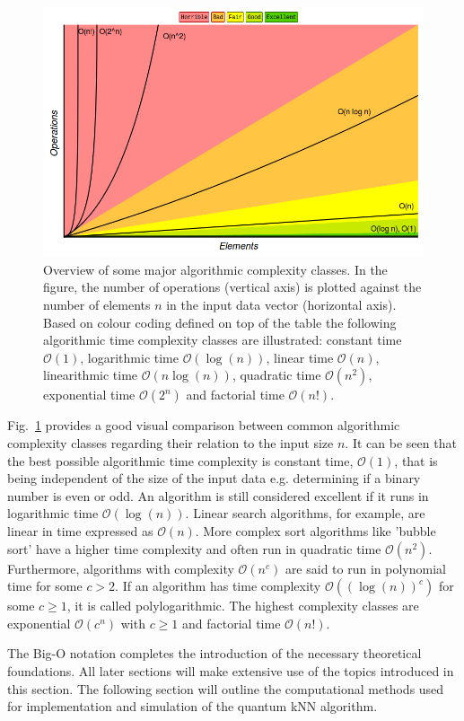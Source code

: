 \begin{figure}[H]
      \centering
       \includegraphics[scale=0.43]{img/bigocomplexity.png}
       \caption[]{\label{fig:algcomplexities} Overview of some major algorithmic complexity classes. In the figure, the number of operations (vertical axis) is plotted against the number of elements $n$ in the input data vector (horizontal axis). Based on colour coding defined on top of the table the following algorithmic time complexity classes are illustrated: constant time $\mathcal{O}(1)$, logarithmic time $\mathcal{O}(\log(n))$, linear time $\mathcal{O}(n)$, linearithmic time $\mathcal{O}(n\mathrm{ }\log(n))$, quadratic time $\mathcal{O}(n^2)$, exponential time $\mathcal{O}(2^n)$ and factorial time $\mathcal{O}(n!)$.\footnotemark[6]}
\end{figure}

Fig.~\ref{fig:algcomplexities} provides a good visual comparison between common algorithmic complexity classes regarding their relation to the input size $n$. It can be seen that the best possible algorithmic time complexity is constant time, $\mathcal{O}(1)$, that is being independent of the size of the input data e.g. determining if a binary number is even or odd. An algorithm is still considered excellent if it runs in logarithmic time $\mathcal{O}(\log(n))$. Linear search algorithms, for example, are linear in time expressed as $\mathcal{O}(n)$. More complex sort algorithms like 'bubble sort' have a higher time complexity and often run in quadratic time $\mathcal{O}(n^2)$. Furthermore, algorithms with complexity $\mathcal{O}(n^c)$ are said to run in polynomial time for some $c > 2$. If an algorithm has time complexity $\mathcal{O}((\log(n))^c)$ for some $c \geq 1$, it is called polylogarithmic. The highest complexity classes are exponential $\mathcal{O}(c^n)$ with $c \geq 1$ and factorial time $\mathcal{O}(n!)$. 

The Big-O notation completes the introduction of the necessary theoretical foundations. All later sections will make extensive use of the topics introduced in this section. The following section will outline the computational methods used for implementation and simulation of the quantum kNN algorithm.
